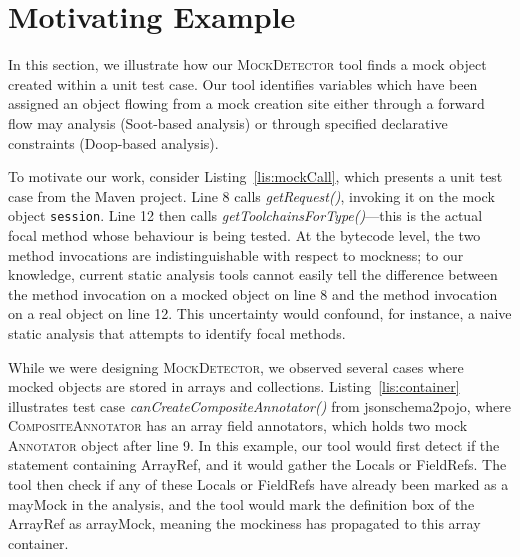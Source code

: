 \section{Motivating Example}
\label{sec:motivating-example}

In this section, we illustrate how our \textsc{MockDetector} tool finds a mock object created within a unit test case. Our tool identifies variables which have been assigned an object flowing from a mock creation site either through a forward flow may analysis (Soot-based analysis) or through specified declarative constraints (Doop-based analysis).


To motivate our work, consider Listing~\ref{lis:mockCall}, which presents a unit test case from the Maven project. Line 8 calls \textit{getRequest()}, invoking it on the mock object \texttt{session}. Line 12 then calls \textit{getToolchainsForType()}---this is the actual focal method whose behaviour is being tested. At the bytecode level, the two method invocations are indistinguishable with respect to mockness; to our knowledge, current static analysis tools cannot easily tell the difference between the method invocation on a mocked object on line 8 and the method invocation on a real object on line 12. This uncertainty would confound, for instance, a naive static analysis that attempts to identify focal methods.

While we were designing \textsc{MockDetector}, we observed several cases where mocked objects are stored in arrays and collections. Listing~\ref{lis:container} illustrates test case \textit{canCreateCompositeAnnotator()} from jsonschema2pojo, where \textsc{CompositeAnnotator} has an array field annotators, which holds two mock \textsc{Annotator} object after line 9. In this example, our tool would first detect if the statement containing ArrayRef, and it would gather the Locals or FieldRefs. The tool then check if any of these Locals or FieldRefs have already been marked as a mayMock in the analysis, and the tool would mark the definition box of the ArrayRef as arrayMock, meaning the mockiness has propagated to this array container. 


